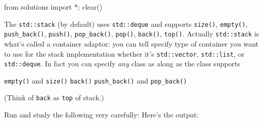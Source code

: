 \begin{python0}
from solutions import *; clear()
\end{python0}

The \verb!std::stack! (by default) uses \verb!std::deque! and supports
\verb!size()!, \verb!empty()!,
\verb!push_back()!,
\verb!push()!,
\verb!pop_back()!, \verb!pop()!,
\verb!back()!, \verb!top()!.
Actually \verb!std::stack! is what's called a container adaptor:
you can tell specify  type of container you want to use for the stack
implementation
whether it's \verb!std::vector!, \verb!std::list!, or \verb!std::deque!.
In fact you can specify \textit{any} class as along as
the class supports
\begin{tightlist}
  \li \texttt{empty()} and \texttt{size()}
  \li \texttt{back()}
  \li \texttt{push\_back()} and \texttt{pop\_back()}
\end{tightlist}
(Think of \texttt{back} as \texttt{top} of stack.)

Run and study the following very carefully:
Here's the output:

